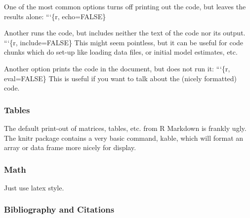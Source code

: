 \documentclass[11pt,]{article}
\begin{document}
One of the most common options turns off printing out the code, but
leaves the results alone: ```\{r, echo=FALSE\}

Another runs the code, but includes neither the text of the code nor its
output. ```\{r, include=FALSE\} This might seem pointless, but it can be
useful for code chunks which do set-up like loading data files, or
initial model estimates, etc.

Another option prints the code in the document, but does not run it:
```\{r, eval=FALSE\} This is useful if you want to talk about the
(nicely formatted) code.

\subsubsection{Tables}\label{tables}

The default print-out of matrices, tables, etc. from R Markdown is
frankly ugly. The knitr package contains a very basic command, kable,
which will format an array or data frame more nicely for display.

\subsubsection{Math}\label{math}

Just use latex style.

\subsubsection{Bibliography and
Citations}\label{bibliography-and-citations}
\end{document}
